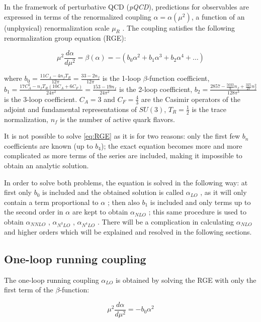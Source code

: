 \documentclass[../main.tex]{subfiles}
\begin{document}
In the framework of perturbative QCD (\emph{pQCD}), predictions for observables are expressed in
terms of the renormalized coupling $\alpha = \alpha (\mu^2)$, a function of an (unphysical) renormalization scale
$\mu_R$ .
The coupling satisfies the following renormalization group equation (RGE):

\begin{equation}\label{eq:RGE}
    \mu^2 \frac{d\alpha}{d\mu^2} = \beta(\alpha) = -\left( b_0 \alpha^2 + b_1 \alpha^3 + b_2 \alpha^4 + \ldots \right)
\end{equation}

where $b_0 = \frac{11C_A-4 n_f T_R}{12\pi} = \frac{33-2 n_f}{12\pi}$ is the 1-loop $\beta$-function coefficient,  
$b_1 = \frac{17C_A^2 - n_f T_R(10C_A + 6 C_F)}{24\pi^2} = \frac{153-19n_f}{24\pi^2}$ is the 2-loop coefficient, 
$b_2 = \frac{2857-\frac{5033}{9}n_f + \frac{325}{27}n_f^2}{128\pi^3}$ is the 3-loop coefficient.
$C_A = 3$ and $C_F = \frac{4}{3}$ are the Casimir operators of the adjoint and fundamental representations of $SU(3)$,
$T_R = \frac{1}{2}$ is the trace normalization, $n_f$ is the number of active quark flavors. 

It is not possible to solve \cref{eq:RGE} as it is for two reasons: only the first few $b_n$ 
coefficients are known (up to $b_4$); the exact equation becomes more and more complicated 
as more terms of the series are included, making it impossible to obtain an analytic solution.

In order to solve both problems, the equation is solved in the following way: at first only $b_0$
is included and the obtained solution is called $\alpha_{LO}$ , as it will only contain a term proportional to
$\alpha$ ; then also $b_1$ is included and only terms up to the second order in $\alpha$ are kept to obtain $\alpha_{NLO}$ ;
this same procedure is used to obtain $\alpha_{NNLO}$ , $\alpha_{N^3LO}$ , $\alpha_{N^4LO}$ . There will be a complication in
calculating $\alpha_{NLO}$ and higher orders which will be explained and resolved in the following sections.

\subsection{One-loop running coupling}

The one-loop running coupling $\alpha_{LO}$ is obtained by solving the RGE with only the first term of the $\beta$-function:

\begin{equation}
    \mu^2 \frac{d\alpha}{d\mu^2} = - b_0 \alpha^2
\end{equation}
\end{document}
